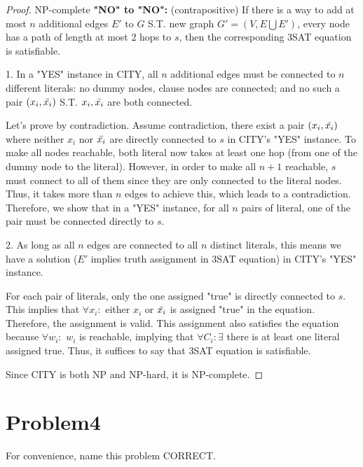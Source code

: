 \documentclass[openany]{article}
\begin{document}
\begin{proof}{NP-complete}
    \textbf{"NO" to "NO":} (contrapositive) If there is a way to add at most $n$ additional edges $E'$ to $G$ S.T. new graph $G'=(V,E\bigcup E')$, every node has a path of length at most 2 hops to $s$, then the corresponding 3SAT equation is satisfiable.

    1. In a "YES" instance in CITY, all $n$ additional edges must be connected to $n$ different literals: no dummy nodes, clause nodes are connected; and no such a pair $(x_i, \Bar{x_i})$ S.T. $x_i, \Bar{x_i}$ are both connected.

    Let's prove by contradiction. Assume contradiction, there exist a pair $(x_i, \Bar{x_i})$ where neither $x_i$ nor $\Bar{x_i}$ are directly connected to $s$ in CITY's "YES" instance. To make all nodes reachable, both literal now takes at least one hop (from one of the dummy node to the literal). However, in order to make all $n+1$ reachable, $s$ must connect to all of them since they are only connected to the literal nodes. Thus, it takes more than $n$ edges to achieve this, which leads to a contradiction. Therefore, we show that in a "YES" instance, for all $n$ pairs of literal, one of the pair must be connected directly to $s$.
    
    2. As long as all $n$ edges are connected to all $n$ distinct literals, this means we have a solution ($E'$ implies truth assignment in 3SAT equation) in CITY's "YES" instance.

    For each pair of literals, only the one assigned "true" is directly connected to $s$. This implies that $\forall x_i:$ either $x_i$ or $\Bar{x_i}$ is assigned "true" in the equation. Therefore, the assignment is valid. This assignment also satisfies the equation because $\forall w_i:$ $w_i$ is reachable, implying that $\forall C_i: \exists$ there is at least one literal assigned true. Thus, it suffices to say that 3SAT equation is satisfiable.

    Since CITY is both NP and NP-hard, it is NP-complete.
    
   
\end{proof}


\section*{Problem4}

For convenience, name this problem CORRECT.
\end{document}
